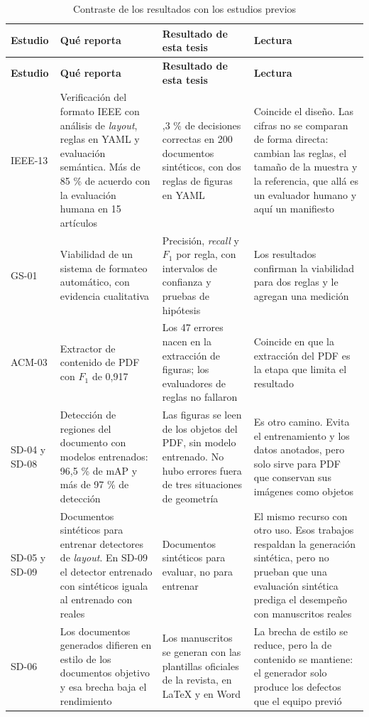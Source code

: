 {\small
\begin{longtable}{@{}>{\raggedright\arraybackslash}p{}>{\raggedright\arraybackslash}p{}>{\raggedright\arraybackslash}p{}>{\raggedright\arraybackslash}p{}@{}}
\caption{Contraste de los resultados con los estudios previos}\label{tab:4-11}\\
\toprule
\textbf{Estudio} & \textbf{Qué reporta} & \textbf{Resultado de esta tesis} & \textbf{Lectura} \\
\midrule
\endfirsthead
\toprule
\textbf{Estudio} & \textbf{Qué reporta} & \textbf{Resultado de esta tesis} & \textbf{Lectura} \\
\midrule
\endhead
\bottomrule
\endfoot
\endlastfoot
IEEE-13 \cite{ref9} & Verificación del formato IEEE con análisis de \emph{layout}, reglas en YAML y evaluación semántica. Más de 85 \% de acuerdo con la evaluación humana en 15 artículos & 95,3 \% de decisiones correctas en 200 documentos sintéticos, con dos reglas de figuras en YAML & Coincide el diseño. Las cifras no se comparan de forma directa: cambian las reglas, el tamaño de la muestra y la referencia, que allá es un evaluador humano y aquí un manifiesto \\
\addlinespace
GS-01 \cite{ref5} & Viabilidad de un sistema de formateo automático, con evidencia cualitativa & Precisión, \emph{recall} y $F_1$ por regla, con intervalos de confianza y pruebas de hipótesis & Los resultados confirman la viabilidad para dos reglas y le agregan una medición \\
\addlinespace
ACM-03 \cite{ref4} & Extractor de contenido de PDF con $F_1$ de 0,917 & Los 47 errores nacen en la extracción de figuras; los evaluadores de reglas no fallaron & Coincide en que la extracción del PDF es la etapa que limita el resultado \\
\addlinespace
SD-04 y SD-08 \cite{ref17,ref21} & Detección de regiones del documento con modelos entrenados: 96,5 \% de mAP y más de 97 \% de detección & Las figuras se leen de los objetos del PDF, sin modelo entrenado. No hubo errores fuera de tres situaciones de geometría & Es otro camino. Evita el entrenamiento y los datos anotados, pero solo sirve para PDF que conservan sus imágenes como objetos \\
\addlinespace
SD-05 y SD-09 \cite{ref18,ref22} & Documentos sintéticos para entrenar detectores de \emph{layout}. En SD-09 el detector entrenado con sintéticos iguala al entrenado con reales & Documentos sintéticos para evaluar, no para entrenar & El mismo recurso con otro uso. Esos trabajos respaldan la generación sintética, pero no prueban que una evaluación sintética prediga el desempeño con manuscritos reales \\
\addlinespace
SD-06 \cite{ref19} & Los documentos generados difieren en estilo de los documentos objetivo y esa brecha baja el rendimiento & Los manuscritos se generan con las plantillas oficiales de la revista, en LaTeX y en Word & La brecha de estilo se reduce, pero la de contenido se mantiene: el generador solo produce los defectos que el equipo previó \\
\end{longtable}
}

